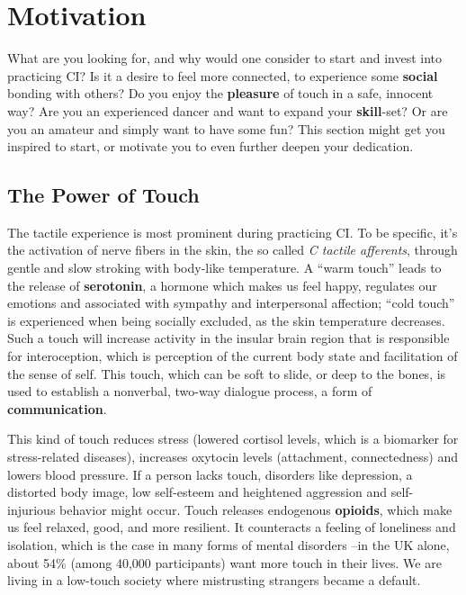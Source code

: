\chapter{Motivation}\label{ch:motivation}


What are you looking for, and why would one consider to start and invest into practicing CI?
Is it a desire to feel more connected, to experience some \textbf{social} bonding with others?
Do you enjoy the \textbf{pleasure} of touch in a safe, innocent way?
Are you an experienced dancer and want to expand your \textbf{skill}-set?
Or are you an amateur and simply want to have some fun?
This section might get you inspired to start, or motivate you to even further deepen your dedication.


\section{The Power of Touch}\label{sec:the-power-of-touch}

The tactile experience is most prominent during practicing CI. To be specific, it's the activation of nerve fibers in the skin, the so called \textit{C tactile afferents}, through gentle and slow stroking with body-like temperature.
A ``warm touch'' leads to the release of \textbf{serotonin}, a hormone which makes us feel happy, regulates our emotions and associated with sympathy and interpersonal affection; ``cold touch'' is experienced when being socially excluded, as the skin temperature decreases.
Such a touch will increase activity in the insular brain region that is responsible for interoception, which is perception of the current body state and facilitation of the sense of self.
This touch, which can be soft to slide, or deep to the bones, is used to establish a nonverbal, two-way dialogue process, a form of \textbf{communication}.

This kind of touch reduces stress (lowered cortisol levels, which is a biomarker for stress-related diseases), increases oxytocin levels (attachment, connectedness) and lowers blood pressure.
If a person lacks touch, disorders like depression, a distorted body image, low self-esteem and heightened aggression and self-injurious behavior might occur.
Touch releases endogenous \textbf{opioids}, which make us feel relaxed, good, and more resilient.
It counteracts a feeling of loneliness and isolation, which is the case in many forms of mental disorders --in the UK alone, about 54\% (among 40,000 participants) want more touch in their lives.
We are living in a low-touch society where mistrusting strangers became a default.

